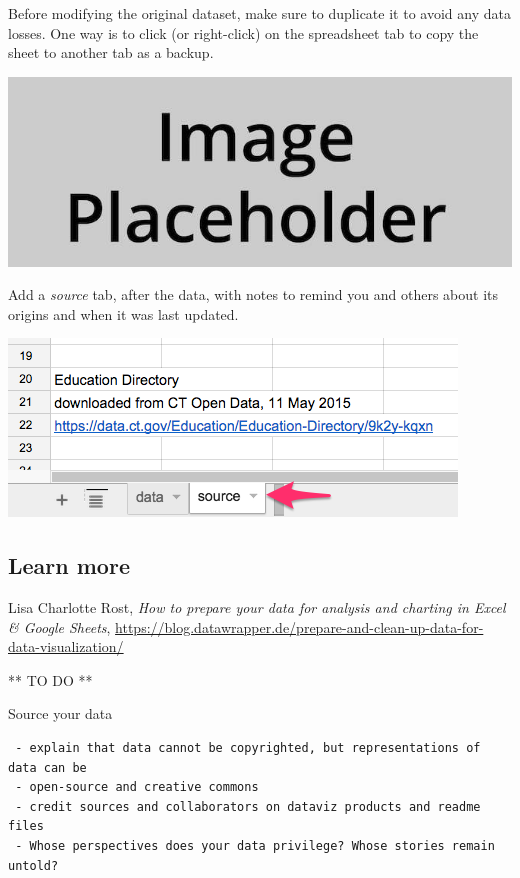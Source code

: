 \documentclass[
  english,
]{book}
\begin{document}
Before modifying the original dataset, make sure to duplicate it to avoid any data losses. One way is to click (or right-click) on the spreadsheet tab to copy the sheet to another tab as a backup.

\includegraphics{images/placeholder.jpg}

Add a \emph{source} tab, after the data, with notes to remind you and others about its origins and when it was last updated.

\includegraphics{images/03-find/SpreadsheetSourceTab.png}

\hypertarget{learn-more-3}{%
\subsection{Learn more}\label{learn-more-3}}

Lisa Charlotte Rost, \emph{How to prepare your data for analysis and charting in Excel \& Google Sheets},
\url{https://blog.datawrapper.de/prepare-and-clean-up-data-for-data-visualization/}

** TO DO **

Source your data

\begin{verbatim}
 - explain that data cannot be copyrighted, but representations of data can be
 - open-source and creative commons
 - credit sources and collaborators on dataviz products and readme files
 - Whose perspectives does your data privilege? Whose stories remain untold?
\end{verbatim}
\end{document}
